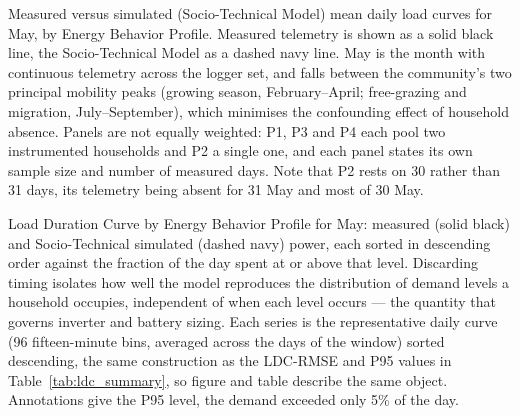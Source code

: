 \caption{Measured versus simulated (Socio-Technical Model) mean daily load
curves for May, by Energy Behavior Profile. Measured telemetry is shown as
a solid black line, the Socio-Technical Model as a dashed navy line. May is
the month with continuous telemetry across the logger set, and falls between
the community's two principal mobility peaks (growing season, February--April;
free-grazing and migration, July--September), which minimises the confounding
effect of household absence. Panels are not equally weighted: P1, P3 and P4
each pool two instrumented households and P2 a single one, and each panel
states its own sample size and number of measured days. Note that P2 rests on
30 rather than 31 days, its telemetry being absent for 31 May and most of
30 May.}
\label{fig:tier1_overlay}


\caption{Load Duration Curve by Energy Behavior Profile for May: measured
(solid black) and Socio-Technical simulated (dashed navy) power, each sorted
in descending order against the fraction of the day spent at or above that
level. Discarding timing isolates how well the model reproduces the
distribution of demand levels a household occupies, independent of when each
level occurs --- the quantity that governs inverter and battery sizing. Each
series is the representative daily curve (96 fifteen-minute bins, averaged
across the days of the window) sorted descending, the same construction as
the LDC-RMSE and P95 values in Table~\ref{tab:ldc_summary}, so figure and
table describe the same object. Annotations give the P95 level, the demand
exceeded only 5\% of the day.}
\label{fig:ldc}


